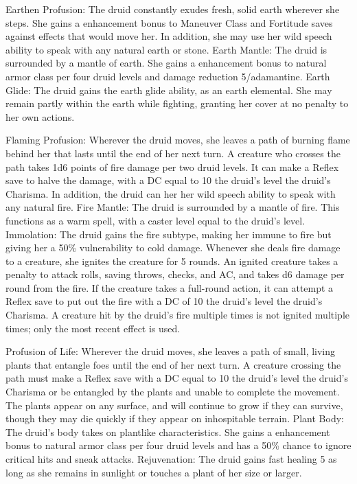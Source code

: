 \begin{greaterwildaspect}
\wilditem Earthen Profusion: The druid constantly exudes fresh, solid earth wherever she steps. She gains a  enhancement bonus to Maneuver Class and Fortitude saves against effects that would move her. In addition, she may use her wild speech ability to speak with any natural earth or stone.
\wilditem Earth Mantle: The druid is surrounded by a mantle of earth. She gains a  enhancement bonus to natural armor class per four druid levels and damage reduction 5/adamantine.
\wilditemplus Earth Glide: The druid gains the earth glide ability, as an earth elemental. She may remain partly within the earth while fighting, granting her cover at no penalty to her own actions.
\end{greaterwildaspect}

\begin{greaterwildaspect}
\wilditem Flaming Profusion: Wherever the druid moves, she leaves a path of burning flame behind her that lasts until the end of her next turn. A creature who crosses the path takes 1d6 points of fire damage per two druid levels. It can make a Reflex save to halve the damage, with a DC equal to 10 \add the druid's level \add the druid's Charisma. In addition, the druid can her her wild speech ability to speak with any natural fire.
\wilditem Fire Mantle: The druid is surrounded by a mantle of fire. This functions as a warm  spell, with a caster level equal to the druid's level.
\wilditemplus Immolation: The druid gains the fire subtype, making her immune to fire but giving her a 50\% vulnerability to cold damage. Whenever she deals fire damage to a creature, she ignites the creature for 5 rounds. An ignited creature takes a  penalty to attack rolls, saving throws, checks, and AC, and takes d6 damage per round from the fire. If the creature takes a full-round action, it can attempt a Reflex save to put out the fire with a DC of 10 \add the druid's level \add the druid's Charisma. A creature hit by the druid's fire multiple times is not ignited multiple times; only the most recent effect is used.
\end{greaterwildaspect}

\begin{greaterwildaspect}
\wilditem Profusion of Life: Wherever the druid moves, she leaves a path of small, living plants that entangle foes until the end of her next turn. A creature crossing the path must make a Reflex save with a DC equal to 10 \add the druid's level \add the druid's Charisma or be entangled by the plants and unable to complete the movement. The plants appear on any surface, and will continue to grow if they can survive, though they may die quickly if they appear on inhospitable terrain.
\wilditem Plant Body: The druid's body takes on plantlike characteristics. She gains a  enhancement bonus to natural armor class per four druid levels and has a 50\% chance to ignore critical hits and sneak attacks.
\wilditemplus Rejuvenation: The druid gains fast healing 5 as long as she remains in sunlight or touches a plant of her size or larger.
\end{greaterwildaspect}

